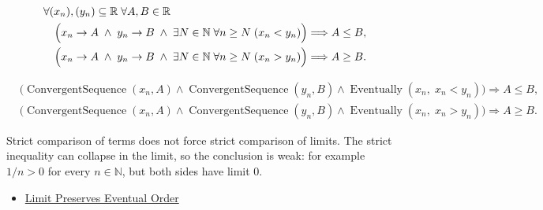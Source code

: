 \begin{remark*}
\[
\begin{aligned}
&\forall (x_n),(y_n)\subseteq\mathbb{R}\;\forall A,B\in\mathbb{R}\\
&\quad\Bigl(
  x_n\to A
  \;\land\;
  y_n\to B
  \;\land\;
  \exists N\in\mathbb{N}\;\forall n\ge N\;(x_n<y_n)
\Bigr)
\Longrightarrow A\le B,\\
&\quad\Bigl(
  x_n\to A
  \;\land\;
  y_n\to B
  \;\land\;
  \exists N\in\mathbb{N}\;\forall n\ge N\;(x_n>y_n)
\Bigr)
\Longrightarrow A\ge B.
\end{aligned}
\]
\end{remark*}

\begin{remark*}
\[
\begin{aligned}
&\bigl(
\operatorname{ConvergentSequence}(x_n,A)
\land
\operatorname{ConvergentSequence}(y_n,B)
\land
\operatorname{Eventually}(x_n,\;x_n<y_n)
\bigr)
\Longrightarrow A\le B,\\
&\bigl(
\operatorname{ConvergentSequence}(x_n,A)
\land
\operatorname{ConvergentSequence}(y_n,B)
\land
\operatorname{Eventually}(x_n,\;x_n>y_n)
\bigr)
\Longrightarrow A\ge B.
\end{aligned}
\]
\end{remark*}

\begin{remark*}[Interpretation]
Strict comparison of terms does not force strict comparison of limits. The
strict inequality can collapse in the limit, so the conclusion is weak:
for example $1/n>0$ for every $n\in\mathbb{N}$, but both sides have limit
$0$.
\end{remark*}

\begin{remark*}[Dependencies]
\begin{itemize}
  \item \hyperref[thm:limit-preserves-eventual-order]{Limit Preserves Eventual Order}
\end{itemize}
\end{remark*}


